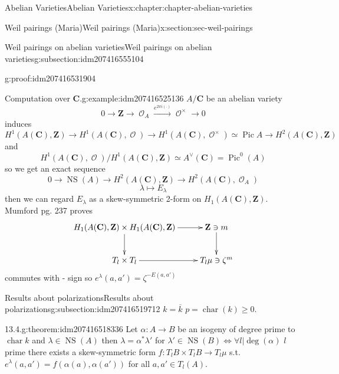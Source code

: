 \documentclass[oneside,10pt,]{book}
\numberwithin{equation}{section}
\newcommand{\sheaf}[1]{\operatorname{\mathcal{#1}}}
\newcommand{\ZZ}{\mathbf{Z}}
\newcommand{\CC}{\mathbf{C}}
\DeclareMathOperator{\Pic}{Pic}
\DeclareMathOperator{\characteristic}{char}
\DeclareMathOperator{\NS}{NS}
\begin{document}
\begin{chapterptx}{Abelian Varieties}{}{Abelian Varieties}{}{}{x:chapter:chapter-abelian-varieties}
\begin{sectionptx}{Weil pairings (Maria)}{}{Weil pairings (Maria)}{}{}{x:section:sec-weil-pairings}
\begin{subsectionptx}{Weil pairings on abelian varieties}{}{Weil pairings on abelian varieties}{}{}{g:subsection:idm207416555104}
\begin{proofptx}{}{g:proof:idm207416531904}
%
\end{proofptx}
\begin{example}{Computation over \(\CC\).}{g:example:idm207416525136}%
\(A/\CC\) be an abelian variety%
\begin{equation*}
0\to \ZZ \to \sheaf O_A \xrightarrow{e^{2\pi i (\cdot)}} \sheaf O^\times \to 0
\end{equation*}
induces%
\begin{equation*}
H^1(A(\CC), \ZZ) \to H^1(A(\CC), \sheaf O) \to H^1(A(\CC), \sheaf O^\times) \simeq \Pic A \to H^2(A(\CC), \ZZ)
\end{equation*}
and%
\begin{equation*}
H^1(A(\CC), \sheaf O)/ H^1(A(\CC), \ZZ) \simeq A^\vee(\CC) = \Pic^0(A)
\end{equation*}
so we get an exact sequence%
\begin{equation*}
0 \to \NS(A) \to H^2 (A(\CC),\ZZ) \to H^2(A(\CC),\sheaf O_A)
\end{equation*}
%
\begin{equation*}
\lambda \mapsto E_\lambda
\end{equation*}
then we can regard \(E_\lambda\) as a skew-symmetric 2-form on \(H_1(A(\CC), \ZZ)\). Mumford pg. 237 proves%
\begin{equation*}
\xymatrix{
H_1(A(\CC), \ZZ) \times H_1(A(\CC), \ZZ) \ar[r] \ar[d] & \ZZ\ni m \ar[d] \\
T_l \times T_l \ar[r] & T_l \mu \ni \zeta^m
}
\end{equation*}
commutes with - sign so \(e^\lambda (a,a') = \zeta^{-E(a,a')}\)%
\end{example}
\end{subsectionptx}
%
%
\typeout{************************************************}
\typeout{************************************************}
%
\begin{subsectionptx}{Results about polarizations}{}{Results about polarizations}{}{}{g:subsection:idm207416519712}
\(k = \overline k\) \(p = \characteristic (k) \ge 0\).%
\begin{theorem}{13.4.}{}{g:theorem:idm207416518336}%
Let \(\alpha\colon A\to B\) be an isogeny of degree prime to \(\characteristic k\) and \(\lambda \in \NS(A)\) then \(\lambda = \alpha^* \lambda '\) for \(\lambda ' \in \NS(B) \iff \forall l |\deg(\alpha)\) \(l\) prime there exists a skew-symmetric form \(f\colon T_lB\times T_lB \to T_l\mu\) s.t. \(e^\lambda(a,a') = f(\alpha(a), \alpha(a'))\) for all \(a,a' \in T_l(A)\).%
\end{theorem}

\end{subsectionptx}
\end{sectionptx}
\end{chapterptx}
\end{document}
